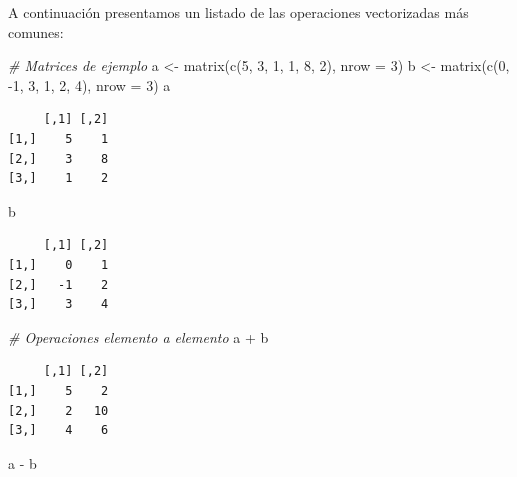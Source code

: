 \documentclass[
]{book}
\newenvironment{Shaded}{\begin{snugshade}}{\end{snugshade}}
\newcommand{\AttributeTok}[1]{\textcolor[rgb]{0.77,0.63,0.00}{#1}}
\newcommand{\CommentTok}[1]{\textcolor[rgb]{0.56,0.35,0.01}{\textit{#1}}}
\newcommand{\DecValTok}[1]{\textcolor[rgb]{0.00,0.00,0.81}{#1}}
\newcommand{\FunctionTok}[1]{\textcolor[rgb]{0.00,0.00,0.00}{#1}}
\newcommand{\NormalTok}[1]{#1}
\newcommand{\OtherTok}[1]{\textcolor[rgb]{0.56,0.35,0.01}{#1}}
\newcommand{\SpecialCharTok}[1]{\textcolor[rgb]{0.00,0.00,0.00}{#1}}
\begin{document}
A continuación presentamos un listado de las operaciones vectorizadas más comunes:

\begin{Shaded}
\begin{Highlighting}[]
\CommentTok{\# Matrices de ejemplo}
\NormalTok{a }\OtherTok{\textless{}{-}} \FunctionTok{matrix}\NormalTok{(}\FunctionTok{c}\NormalTok{(}\DecValTok{5}\NormalTok{, }\DecValTok{3}\NormalTok{, }\DecValTok{1}\NormalTok{, }\DecValTok{1}\NormalTok{, }\DecValTok{8}\NormalTok{, }\DecValTok{2}\NormalTok{), }\AttributeTok{nrow =} \DecValTok{3}\NormalTok{)}
\NormalTok{b }\OtherTok{\textless{}{-}} \FunctionTok{matrix}\NormalTok{(}\FunctionTok{c}\NormalTok{(}\DecValTok{0}\NormalTok{, }\SpecialCharTok{{-}}\DecValTok{1}\NormalTok{, }\DecValTok{3}\NormalTok{, }\DecValTok{1}\NormalTok{, }\DecValTok{2}\NormalTok{, }\DecValTok{4}\NormalTok{), }\AttributeTok{nrow =} \DecValTok{3}\NormalTok{)}
\NormalTok{a}
\end{Highlighting}
\end{Shaded}

\begin{verbatim}
     [,1] [,2]
[1,]    5    1
[2,]    3    8
[3,]    1    2
\end{verbatim}

\begin{Shaded}
\begin{Highlighting}[]
\NormalTok{b}
\end{Highlighting}
\end{Shaded}

\begin{verbatim}
     [,1] [,2]
[1,]    0    1
[2,]   -1    2
[3,]    3    4
\end{verbatim}

\begin{Shaded}
\begin{Highlighting}[]
\CommentTok{\# Operaciones elemento a elemento}
\NormalTok{a }\SpecialCharTok{+}\NormalTok{ b}
\end{Highlighting}
\end{Shaded}

\begin{verbatim}
     [,1] [,2]
[1,]    5    2
[2,]    2   10
[3,]    4    6
\end{verbatim}

\begin{Shaded}
\begin{Highlighting}[]
\NormalTok{a }\SpecialCharTok{{-}}\NormalTok{ b}
\end{Highlighting}
\end{Shaded}
\end{document}
